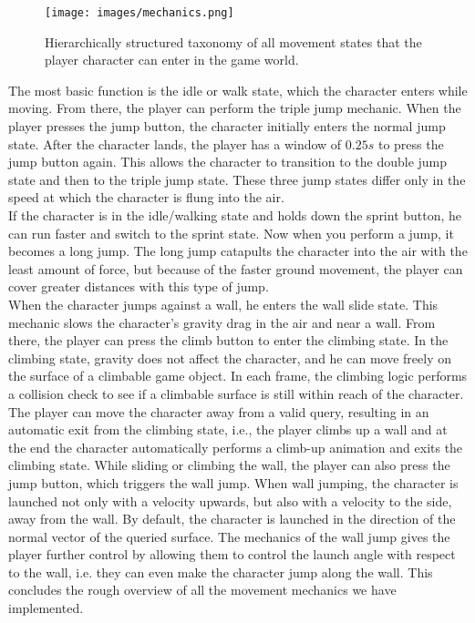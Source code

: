 \documentclass[conference]{IEEEtran}
\begin{document}
\begin{figure}[!ht]
    \centering
    \texttt{[image: images/mechanics.png]} %
    \caption{Hierarchically structured taxonomy of all movement states that the player character can enter in the game world.}
    \label{fig:mechanics}
\end{figure}

The most basic function is the idle or walk state, which the character enters while moving.
From there, the player can perform the triple jump mechanic.
When the player presses the jump button, the character initially enters the normal jump state. 
After the character lands, the player has a window of $\textit{0.25s}$ to press the jump button again.
This allows the character to transition to the double jump state and then to the triple jump state.
These three jump states differ only in the speed at which the character is flung into the air. \\
If the character is in the idle/walking state and holds down the sprint button, he can run faster and switch to the sprint state.
Now when you perform a jump, it becomes a long jump.
The long jump catapults the character into the air with the least amount of force, but because of the faster ground movement, the player can cover greater distances with this type of jump. \\
When the character jumps against a wall, he enters the wall slide state. 
This mechanic slows the character's gravity drag in the air and near a wall.
From there, the player can press the climb button to enter the climbing state.
In the climbing state, gravity does not affect the character, and he can move freely on the surface of a climbable game object.
In each frame, the climbing logic performs a collision check to see if a climbable surface is still within reach of the character.
The player can move the character away from a valid query, resulting in an automatic exit from the climbing state, i.e., the player climbs up a wall and at the end the character automatically performs a climb-up animation and exits the climbing state.
While sliding or climbing the wall, the player can also press the jump button, which triggers the wall jump.
When wall jumping, the character is launched not only with a velocity upwards, but also with a velocity to the side, away from the wall.
By default, the character is launched in the direction of the normal vector of the queried surface.
The mechanics of the wall jump gives the player further control by allowing them to control the launch angle with respect to the wall, i.e. they can even make the character jump along the wall.
This concludes the rough overview of all the movement mechanics we have implemented.
\end{document}
